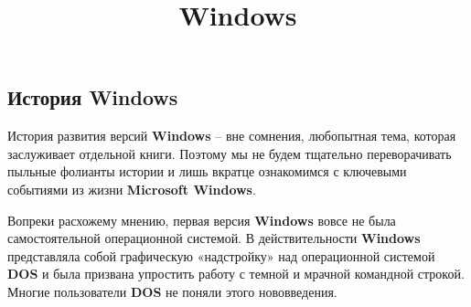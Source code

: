 \documentclass[14pt, a4paper]{article}
\title{Windows}
\begin{document}
\begin{center}
\section*{История Windows}
\end{center}

\begin{figure}[h]%
    \centering
    \label{framework} %
\end{figure}

История развития версий \textbf{Windows} – вне сомнения, любопытная тема, которая заслуживает отдельной книги. 
Поэтому мы не будем тщательно переворачивать пыльные фолианты истории и лишь вкратце ознакомимся с ключевыми событиями из жизни \textbf{Microsoft Windows}.


Вопреки расхожему мнению, первая версия \textbf{Windows} вовсе не была самостоятельной операционной системой.
В действительности \textbf{Windows} представляла собой графическую «надстройку» над операционной системой \textbf{DOS} и была призвана упростить работу с темной и мрачной командной строкой. 
Многие пользователи \textbf{DOS} не поняли этого нововведения.
\end{document}
